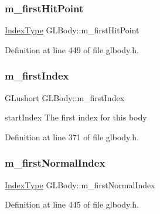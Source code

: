 \subsubsection{\texorpdfstring{m\_firstHitPoint}{m\_firstHitPoint}}
{\footnotesize\ttfamily \mbox{\hyperlink{gldefines_8h_af3c748960f29c42e5b7f1dc449ab66ff}{Index\+Type}} G\+L\+Body\+::m\+\_\+first\+Hit\+Point\hspace{0.3cm}{\ttfamily [protected]}}



Definition at line 449 of file glbody.\+h.

\mbox{\label{class_g_l_body_a8274ed0febea3f7b3e1a4e2ac8c49314}} 
\subsubsection{\texorpdfstring{m\_firstIndex}{m\_firstIndex}}
{\footnotesize\ttfamily G\+Lushort G\+L\+Body\+::m\+\_\+first\+Index\hspace{0.3cm}{\ttfamily [protected]}}



start\+Index The first index for this body 



Definition at line 371 of file glbody.\+h.

\mbox{\label{class_g_l_body_a3deb492827b145e78753bb69da5a1273}} 
\subsubsection{\texorpdfstring{m\_firstNormalIndex}{m\_firstNormalIndex}}
{\footnotesize\ttfamily \mbox{\hyperlink{gldefines_8h_af3c748960f29c42e5b7f1dc449ab66ff}{Index\+Type}} G\+L\+Body\+::m\+\_\+first\+Normal\+Index\hspace{0.3cm}{\ttfamily [protected]}}



Definition at line 445 of file glbody.\+h.

\mbox{\label{class_g_l_body_a790f0028b0ad3c1e08a9c7314fbb91ea}} 
